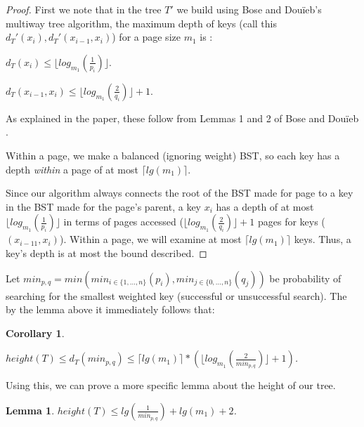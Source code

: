 \documentclass[letterpaper,12pt,titlepage,oneside,final]{book}
\theoremstyle{plain}
\newtheorem{lem}[thm]{Lemma}
\newtheorem*{cor}{Corollary}
\begin{document}
\begin{proof}
First we note that in the tree $T'$ we build using Bose and Dou\"{i}eb's multiway tree algorithm, the maximum depth of keys (call this $d_T'(x_i), d_T'(x_{i-1},x_i)$) for a page size $m_1$ is \cite{bose2009efficient}:
\begin{center} $d_T(x_i) \leq \lfloor log_{m_1}(\frac{1}{p_i}) \rfloor$. \end{center} 
\begin{center} $d_T(x_{i-1},x_i) \leq \lfloor log_{m_1}(\frac{2}{q_i}) \rfloor + 1$. \end{center}
As explained in the paper, these follow from Lemmas 1 and 2 of Bose and Dou\"{i}eb \cite{bose2009efficient}.

Within a page, we make a balanced (ignoring weight) BST, so each key has a depth \textit{within} a page of at most $\lceil lg(m_1) \rceil$.

Since our algorithm always connects the root of the BST made for page to a key in the BST made for the page's parent, a key $x_i$ has a depth of at most $\lfloor log_{m_1}(\frac{1}{p_i}) \rfloor$ in terms of pages accessed ($\lfloor log_{m_1}(\frac{2}{q_i}) \rfloor + 1$ pages for keys ($(x_{i-11},x_i)$). Within a page, we will examine at most $\lceil lg(m_1) \rceil$ keys. Thus, a key's depth is at most the bound described.
\end{proof}

Let $min_{p,q} = min(min_{i \in \{1, ..., n\}}(p_i), min_{j \in \{0, ..., n\}}(q_j))$ be probability of searching for the smallest weighted key (successful or unsuccessful search). The by the lemma above it immediately follows that:
\begin{cor}
\begin{center} $height(T) \leq d_T(min_{p,q}) \leq \lceil lg(m_1) \rceil * (\lfloor log_{m_1}(\frac{2}{min_{p,q}}) \rfloor + 1)$. \end{center}
\end{cor}

Using this, we can prove a more specific lemma about the height of our tree. 

\begin{lem}
 $height(T) \leq lg(\frac{1}{min_{p,q}}) + lg(m_1) + 2$.
\end{lem}
\end{document}
